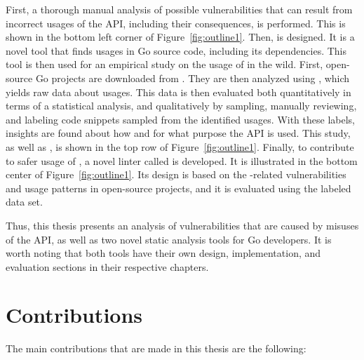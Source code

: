 


First, a thorough manual analysis of possible vulnerabilities that can result from incorrect usages of the \unsafe{}
\acrshort{API}, including their consequences, is performed.
This is shown in the bottom left corner of Figure~\ref{fig:outline1}.
Then, \toolGeiger{} is designed.
It is a novel tool that finds \unsafe{} usages in Go source code, including its dependencies.
This tool is then used for an empirical study on the usage of \unsafe{} in the wild.
First, open-source Go projects are downloaded from \github{}.
They are then analyzed using \toolGeiger{}, which yields raw data about \unsafe{} usages.
This data is then evaluated both quantitatively in terms of a statistical analysis, and qualitatively by sampling,
manually reviewing, and labeling code snippets sampled from the identified \unsafe{} usages.
With these labels, insights are found about how and for what purpose the \unsafe{} \acrshort{API} is used.
This study, as well as \toolGeiger{}, is shown in the top row of Figure~\ref{fig:outline1}.
Finally, to contribute to safer usage of \unsafe{}, a novel linter called \toolSafer{} is developed.
It is illustrated in the bottom center of Figure~\ref{fig:outline1}.
Its design is based on the \unsafe{}-related vulnerabilities and \unsafe{} usage patterns in open-source projects,
and it is evaluated using the labeled data set.

Thus, this thesis presents an analysis of vulnerabilities that are caused by misuses of the \unsafe{} \acrshort{API},
as well as two novel static analysis tools for Go developers.
It is worth noting that both tools have their own design, implementation, and evaluation sections in their respective
chapters.



\section{Contributions}\label{sec:introduction:contributions}

The main contributions that are made in this thesis are the following:

